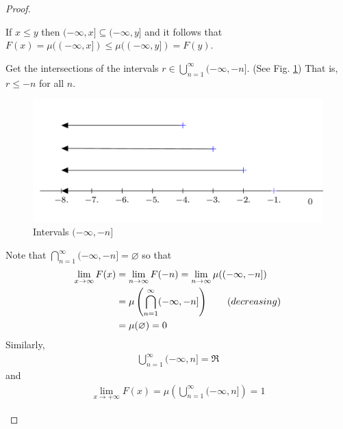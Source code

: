\begin{proof}
\begin{prooflist}
\item If $x\leq y$ then $(-\infty, x]\subseteq (-\infty, y]$ and it follows that $F(x)=\mu((-\infty,x])\leq \mu((-\infty, y])=F(y)$.
\item Get the intersections of the intervals $r\in \bigcup\limits_{n=1}^{\infty}(-\infty,-n]$. (See Fig. \ref{fig:prob:2}) That is, $r\leq -n$ for all $n$.

\begin{figure}[h]
\caption{\label{fig:prob:2} Intervals $(-\infty,-n]$}
\centering
\includegraphics[width=0.75\linewidth]{figures/overlap-intervals.png}
\end{figure}
Note that $\bigcap\limits_{n=1}^\infty (-\infty, -n]=\varnothing$ so that
\begin{align*}
\lim_{x\to\-\infty}F(x)&=\lim_{n\to\infty}F(-n)=\lim_{n\to\infty}\mu((-\infty,-n])\\
	&=\mu\left(\bigcap_{n=1}^\infty(-\infty,-n]\right)\qquad (decreasing)\\
	&=\mu(\varnothing)=0
\end{align*}
Similarly,
\begin{align*}
\bigcup_{n=1}^\infty (-\infty,n]=\Re
\end{align*}
and
\begin{align*}
\lim\limits_{x\to+\infty}F(x)=\mu\left(\bigcup_{n=1}^\infty (-\infty,n]\right)=1
\end{align*}



\end{prooflist}
\end{proof}
